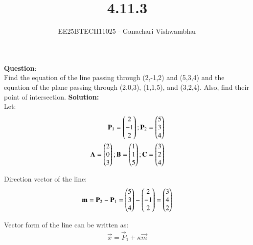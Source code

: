 \documentclass[journal]{IEEEtran}
\begin{document}
\title{4.11.3}
\author{EE25BTECH11025 - Ganachari Vishwambhar}
\maketitle

\textbf{Question}:\\
Find the equation of the line passing through (2,-1,2) and (5,3,4) and the equation of the plane passing through (2,0,3), (1,1,5), and (3,2,4). Also, find their point of intersection.
\textbf{Solution: }\\

Let:
\begin{align}
    \mathbf{P}_1=\begin{pmatrix}2\\-1\\2\end{pmatrix};
    \mathbf{P}_2=\begin{pmatrix}5\\3\\4\end{pmatrix}\\
    \mathbf{A}=\begin{pmatrix}2\\0\\3\end{pmatrix};\mathbf{B}=\begin{pmatrix}1\\1\\5\end{pmatrix};\mathbf{C}=\begin{pmatrix}3\\2\\4\end{pmatrix}    
\end{align}

Direction vector of the line:
\begin{align}
    \mathbf{m}=\mathbf{P}_2-\mathbf{P}_1=\begin{pmatrix}5\\3\\4\end{pmatrix}-\begin{pmatrix}2\\-1\\2\end{pmatrix}=\begin{pmatrix}3\\4\\2\end{pmatrix}
\end{align}

Vector form of the line can be written as:
\begin{align}
    \vec{x}=\vec{P}_1+\kappa\vec{m}
\end{align}
\end{document}
